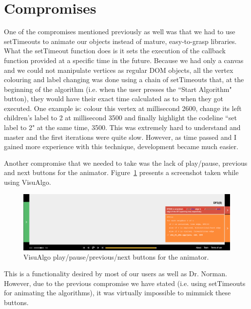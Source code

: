 \documentclass{l4proj}
\begin{document}
\section{Compromises}

One of the compromises mentioned previously as well was that we had to use setTimeouts to animate our objects instead
of mature, easy-to-grasp libraries. What the setTimeout function does is it sets the execution of the callback function
provided at a specific time in the future. Because we had only a canvas and we could not manipulate vertices as regular DOM
objects, all the vertex colouring and label changing was done using a chain of setTimeouts that, at the beginning of the
algorithm (i.e. when the user presses the ``Start Algorithm" button), they would have their exact time calculated as to
when they got executed. One example is: colour this vertex at millisecond 2600, change its left
children's label to 2 at millisecond 3500 and finally highlight the codeline ``set label to 2" at the same time, 3500.
This was extremely hard to understand and master and the first iterations were quite slow. However, as time passed and
I gained more experience with this technique, development became much easier.

Another compromise that we needed to take was the lack of play/pause, previous and next buttons for the animator.
Figure~\ref{fig:play-pause-previous-next} presents a screenshot taken while using VisuAlgo.

\begin{figure}[!ht]
    \centering
    \includegraphics[scale=0.35]{play-pause-previous-next}
    \caption{VisuAlgo play/pause/previous/next buttons for the animator.}
    \label{fig:play-pause-previous-next}
\end{figure}

This is a functionality desired by most of our users as well as Dr. Norman. However, due to the previous compromise we
have stated (i.e. using setTimeouts for animating the algorithms), it was virtually impossible to mimmick these
buttons.

\end{document}
